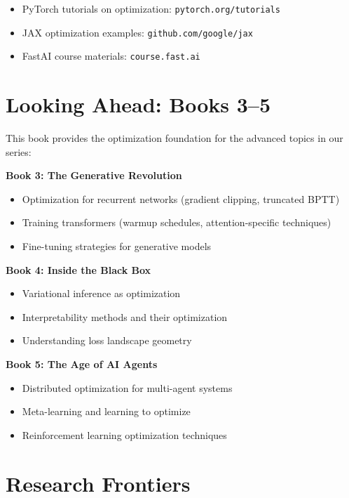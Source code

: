 \documentclass[../main.tex]{subfiles}
\begin{document}
\begin{itemize}
    \item PyTorch tutorials on optimization: \texttt{pytorch.org/tutorials}
    \item JAX optimization examples: \texttt{github.com/google/jax}
    \item FastAI course materials: \texttt{course.fast.ai}
\end{itemize}

\section{Looking Ahead: Books 3--5}

This book provides the optimization foundation for the advanced topics in our series:

\textbf{Book 3: The Generative Revolution}
\begin{itemize}
    \item Optimization for recurrent networks (gradient clipping, truncated BPTT)
    \item Training transformers (warmup schedules, attention-specific techniques)
    \item Fine-tuning strategies for generative models
\end{itemize}

\textbf{Book 4: Inside the Black Box}
\begin{itemize}
    \item Variational inference as optimization
    \item Interpretability methods and their optimization
    \item Understanding loss landscape geometry
\end{itemize}

\textbf{Book 5: The Age of AI Agents}
\begin{itemize}
    \item Distributed optimization for multi-agent systems
    \item Meta-learning and learning to optimize
    \item Reinforcement learning optimization techniques
\end{itemize}

\section{Research Frontiers}
\end{document}

